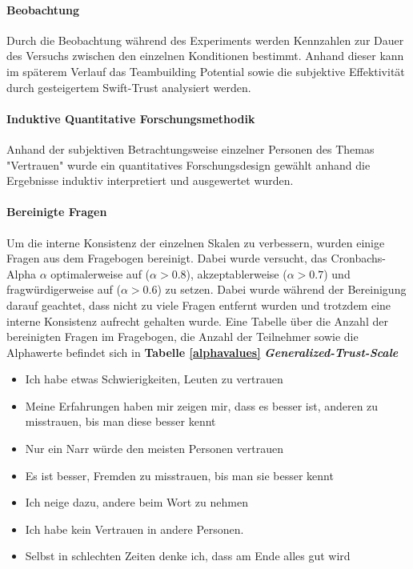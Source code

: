 \documentclass[a4paper,11pt]{article}%
\renewcommand{\\}{\vspace*{0.5\baselineskip} \newline}
\begin{document}
			\paragraph{Beobachtung}
				Durch die Beobachtung während des Experiments werden Kennzahlen zur Dauer des Versuchs zwischen den einzelnen Konditionen bestimmt. Anhand dieser kann im späterem Verlauf das  Teambuilding Potential sowie die subjektive Effektivität durch gesteigertem Swift-Trust analysiert werden.
			\paragraph{Induktive Quantitative Forschungsmethodik}
				Anhand der subjektiven Betrachtungsweise einzelner Personen des Themas "Vertrauen" wurde ein quantitatives Forschungsdesign gewählt anhand die Ergebnisse induktiv interpretiert und ausgewertet wurden.


			\paragraph{Bereinigte Fragen}
Um die interne Konsistenz der einzelnen Skalen zu verbessern, wurden einige Fragen aus dem Fragebogen bereinigt. Dabei wurde versucht, das Cronbachs-Alpha $\alpha$ optimalerweise auf ($\alpha > 0.8$), akzeptablerweise ($\alpha > 0.7$) und fragwürdigerweise auf ($\alpha > 0.6$) zu setzen. Dabei wurde während der Bereinigung darauf geachtet, dass nicht zu viele Fragen entfernt wurden und trotzdem eine interne Konsistenz aufrecht gehalten wurde. Eine Tabelle über die Anzahl der bereinigten Fragen im Fragebogen, die Anzahl der Teilnehmer sowie die Alphawerte befindet sich in \textbf{Tabelle \ref{alphavalues}} \\
\textbf{\textit{Generalized-Trust-Scale}}
\begin{itemize}
	\item Ich habe etwas Schwierigkeiten, Leuten zu vertrauen
	\item Meine Erfahrungen haben mir zeigen mir, dass es besser ist, anderen zu misstrauen, bis man diese besser kennt
	\item Nur ein Narr würde den meisten Personen vertrauen
	\item Es ist besser, Fremden zu misstrauen, bis man sie besser kennt
	\item Ich neige dazu, andere beim Wort zu nehmen
	\item Ich habe kein Vertrauen in andere Personen.
	\item Selbst in schlechten Zeiten denke ich, dass am Ende alles gut wird
\end{itemize}
\end{document}
